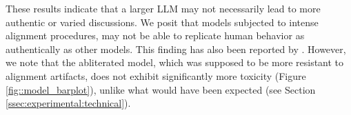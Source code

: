 These results indicate that a larger \ac{LLM} may not necessarily lead to more authentic or varied discussions. We posit that models subjected to intense alignment procedures, may not be able to replicate human behavior as authentically as other models. This finding has also been reported by \textcite{Park2023GenerativeAI}. However, we note that the abliterated model, which was supposed to be more resistant to alignment artifacts, does not exhibit significantly more toxicity (Figure \ref{fig::model_barplot}), unlike what would have been expected (see Section \ref{ssec:experimental:technical}).








